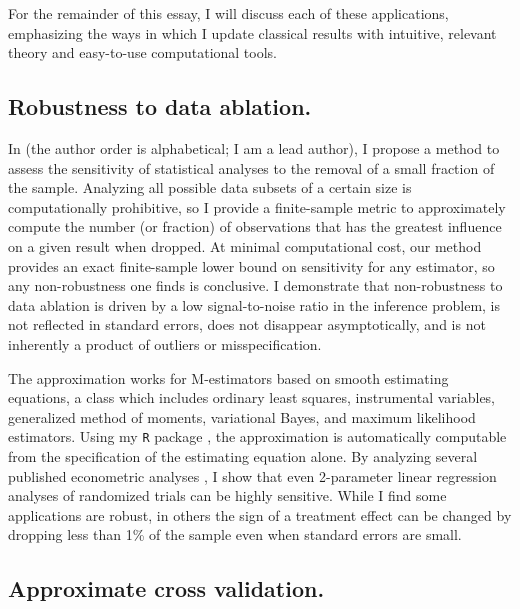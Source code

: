 For the remainder of this essay, I will discuss each of these applications,
emphasizing the ways in which I update classical results with intuitive,
relevant theory and easy-to-use computational tools.

\newpage



\subsection*{Robustness to data ablation.}

In \citet{giordano:2020:amip} (the author order is alphabetical; I am a lead
author), I propose a method to assess the sensitivity of statistical analyses to
the removal of a small fraction of the sample. Analyzing all possible data
subsets of a certain size is computationally prohibitive, so I provide a
finite-sample metric to approximately compute the number (or fraction) of
observations that has the greatest influence on a given result when dropped.  At
minimal computational cost, our method provides an exact finite-sample lower
bound on sensitivity for any estimator, so any non-robustness one finds is
conclusive. I demonstrate that non-robustness to data ablation is driven by a
low signal-to-noise ratio in the inference problem, is not reflected in standard
errors, does not disappear asymptotically, and is not inherently a product of
outliers or misspecification.

The approximation works for M-estimators based on smooth estimating equations, a
class which includes ordinary least squares, instrumental variables, generalized
method of moments, variational Bayes, and maximum likelihood estimators. Using
my \texttt{R} package \citep{zaminfluence}, the approximation is automatically
computable from the specification of the estimating equation alone.  By
analyzing several published econometric analyses \citep{angelucci:2009:indirect,
finkelstein:2012:oregon, meager:2019:microcredit}, I show that even 2-parameter
linear regression analyses of randomized trials can be highly sensitive.  While
I find some applications are robust, in others the sign of a treatment effect
can be changed by dropping less than 1\% of the sample even when standard errors
are small.


\subsection*{Approximate cross validation.}

